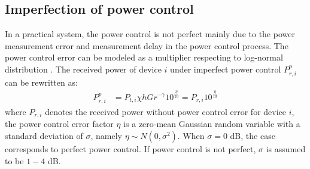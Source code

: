 \subsection{Imperfection of power control}
In a practical system, the power control is not perfect mainly due to the power measurement error and measurement delay in the power control process. The power control error can be modeled as a multiplier respecting to log-normal distribution \cite{TamWM97}. The received power of device $i$ under imperfect power control $P^{p}_{r,i}$ can be rewritten as:
\begin{align}
P^{p}_{r,i} &= P_{t,i}\chi h G r^{-\gamma}10^{\frac{\eta}{10}} = P_{r,i} 10^{\frac{\eta}{10}}
\end{align}
where $P_{r,i}$ denotes the received power without power control error for device $i$, the power control error factor $\eta$ is a zero-mean Gaussian random variable with a standard deviation of $\sigma$, namely $\eta \sim N\left( 0, \sigma^2\right)$. When $\sigma=0$ dB, the case corresponds to perfect power control. If power control is not perfect, $\sigma$ is assumed to be $1-4$ dB. 
 
